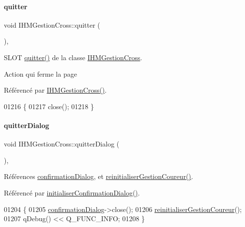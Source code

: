 \paragraph{\texorpdfstring{quitter}{quitter}}
{\footnotesize\ttfamily void I\+H\+M\+Gestion\+Cross\+::quitter (\begin{DoxyParamCaption}{ }\end{DoxyParamCaption})\hspace{0.3cm}{\ttfamily [private]}, {\ttfamily [slot]}}



S\+L\+OT \hyperlink{class_i_h_m_gestion_cross_a9c24746993f720c1067cfe7396ecd5c4}{quitter()} de la classe \hyperlink{class_i_h_m_gestion_cross}{I\+H\+M\+Gestion\+Cross}. 

Action qui ferme la page 

Référencé par \hyperlink{class_i_h_m_gestion_cross_a2c62fd83326a87456a403f46acc408c8}{I\+H\+M\+Gestion\+Cross()}.


\begin{DoxyCode}
01216 \{
01217     close();
01218 \}
\end{DoxyCode}
\mbox{\label{class_i_h_m_gestion_cross_a58b19fa84a16060a3dd951abeba2c543}} 
\paragraph{\texorpdfstring{quitter\+Dialog}{quitterDialog}}
{\footnotesize\ttfamily void I\+H\+M\+Gestion\+Cross\+::quitter\+Dialog (\begin{DoxyParamCaption}{ }\end{DoxyParamCaption})\hspace{0.3cm}{\ttfamily [private]}, {\ttfamily [slot]}}



Références \hyperlink{class_i_h_m_gestion_cross_a417b63ff11c3be6623d17718d9058768}{confirmation\+Dialog}, et \hyperlink{class_i_h_m_gestion_cross_a85c44933ec0dcbb591e01c832063367e}{reinitialiser\+Gestion\+Coureur()}.



Référencé par \hyperlink{class_i_h_m_gestion_cross_aa1c728319c825df582a014fc5bd43ea4}{initialiser\+Confirmation\+Dialog()}.


\begin{DoxyCode}
01204 \{
01205     \hyperlink{class_i_h_m_gestion_cross_a417b63ff11c3be6623d17718d9058768}{confirmationDialog}->close();
01206     \hyperlink{class_i_h_m_gestion_cross_a85c44933ec0dcbb591e01c832063367e}{reinitialiserGestionCoureur}();
01207     qDebug() << Q\_FUNC\_INFO;
01208 \}
\end{DoxyCode}
\mbox{\label{class_i_h_m_gestion_cross_a271efe8d31fbe05fccfb2dc81e71971a}} 
